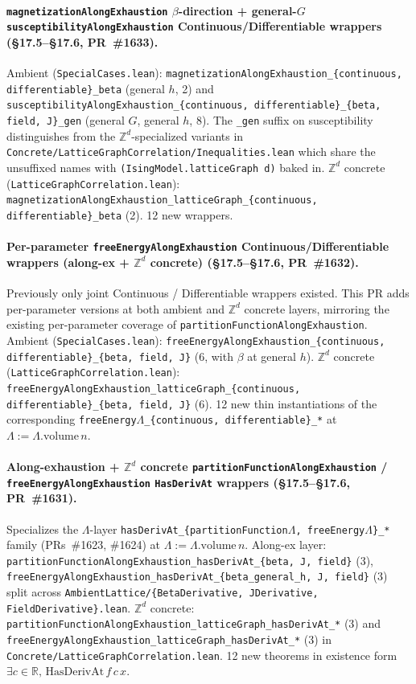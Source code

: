 \documentclass[a4paper,11pt]{article}
\newcommand{\LeanLambda}{\texorpdfstring{\ensuremath{\Lambda}}{Lambda}}
\begin{document}
\paragraph{\texttt{magnetizationAlongExhaustion} $\beta$-direction
+ general-$G$ \texttt{susceptibilityAlongExhaustion}
Continuous/Differentiable wrappers
(\S17.5--\S17.6, PR~\#1633).} Ambient
(\texttt{SpecialCases.lean}):
\texttt{magnetizationAlongExhaustion\_\{continuous,
differentiable\}\_beta} (general $h$, 2) and
\texttt{susceptibilityAlongExhaustion\_\{continuous,
differentiable\}\_\{beta, field, J\}\_gen} (general $G$, general
$h$, 8). The \texttt{\_gen} suffix on susceptibility distinguishes
from the $\mathbb{Z}^d$-specialized variants in
\texttt{Concrete/LatticeGraphCorrelation/Inequalities.lean} which
share the unsuffixed names with \texttt{(IsingModel.latticeGraph
d)} baked in. $\mathbb{Z}^d$ concrete
(\texttt{LatticeGraphCorrelation.lean}):
\texttt{magnetizationAlongExhaustion\_latticeGraph\_\{continuous,
differentiable\}\_beta} (2). 12 new wrappers.

\paragraph{Per-parameter
\texttt{freeEnergyAlongExhaustion} Continuous/Differentiable
wrappers (along-ex + $\mathbb{Z}^d$ concrete)
(\S17.5--\S17.6, PR~\#1632).} Previously only joint Continuous /
Differentiable wrappers existed. This PR adds per-parameter
versions at both ambient and $\mathbb{Z}^d$ concrete layers,
mirroring the existing per-parameter coverage of
\texttt{partitionFunctionAlongExhaustion}. Ambient
(\texttt{SpecialCases.lean}):
\texttt{freeEnergyAlongExhaustion\_\{continuous, differentiable\}\_\{beta, field, J\}}
(6, with $\beta$ at general $h$).
$\mathbb{Z}^d$ concrete (\texttt{LatticeGraphCorrelation.lean}):
\texttt{freeEnergyAlongExhaustion\_latticeGraph\_\{continuous,
differentiable\}\_\{beta, field, J\}} (6). 12 new thin
instantiations of the corresponding
\texttt{freeEnergy\LeanLambda\_\{continuous, differentiable\}\_*} at
$\Lambda := \Lambda.\mathrm{volume}\,n$.

\paragraph{Along-exhaustion + $\mathbb{Z}^d$ concrete
\texttt{partitionFunctionAlongExhaustion} /
\texttt{freeEnergyAlongExhaustion} \texttt{HasDerivAt} wrappers
(\S17.5--\S17.6, PR~\#1631).} Specializes the $\Lambda$-layer
\texttt{hasDerivAt\_\{partitionFunction\LeanLambda, freeEnergy\LeanLambda\}\_*} family
(PRs~\#1623, \#1624) at $\Lambda := \Lambda.\mathrm{volume}\,n$.
Along-ex layer:
\texttt{partitionFunctionAlongExhaustion\_hasDerivAt\_\{beta, J,
field\}} (3),
\texttt{freeEnergyAlongExhaustion\_hasDerivAt\_\{beta\_general\_h,
J, field\}} (3) split across
\texttt{AmbientLattice/\{BetaDerivative, JDerivative,
FieldDerivative\}.lean}.
$\mathbb{Z}^d$ concrete:
\texttt{partitionFunctionAlongExhaustion\_latticeGraph\_hasDerivAt\_*}
(3) and
\texttt{freeEnergyAlongExhaustion\_latticeGraph\_hasDerivAt\_*}
(3) in
\texttt{Concrete/LatticeGraphCorrelation.lean}.
12 new theorems in existence form
$\exists c \in \mathbb{R},\,\mathrm{HasDerivAt}\,f\,c\,x$.
\end{document}
